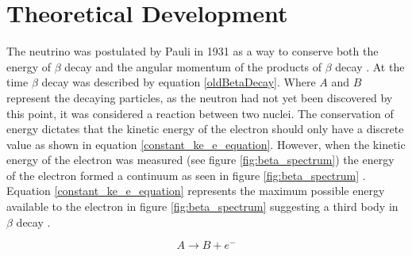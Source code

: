 \section{Theoretical Development}
The neutrino was postulated by Pauli in 1931 as a way to conserve both the energy of $\beta$ decay and the angular momentum of the products of $\beta$ decay  \cite{griffiths2008neutrino1.5}\cite{lederman1970resource}. At the time $\beta$ decay was described by equation \ref{oldBetaDecay}. Where $A$ and $B$ represent the decaying particles, as the neutron had not yet been discovered by this point, it was considered a reaction between two nuclei. The conservation of energy dictates that the kinetic energy of the electron should only have a discrete value as shown in equation \ref{constant_ke_e_equation}. However, when the kinetic energy of the electron was measured (see figure \ref{fig:beta_spectrum}) the energy of the electron formed a continuum as seen in figure \ref{fig:beta_spectrum}  \cite{griffiths2008neutrino1.5} \cite{lewis1970neutrinos}. Equation \ref{constant_ke_e_equation} represents the maximum possible energy available to the electron in figure \ref{fig:beta_spectrum} suggesting a third body in $\beta$ decay  \cite{griffiths2008neutrino1.5}.


\begin{equation}
    A \rightarrow B + e^-
    \label{oldBetaDecay}
\end{equation}

